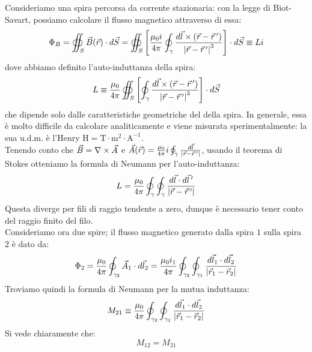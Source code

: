 Consideriamo una spira percorsa da corrente stazionaria: con la legge di Biot-Savart, possiamo calcolare il flusso magnetico attraverso di essa:
\begin{equation}
	\Phi_B = \oiint_S \vec{B}(\vec{r}) \cdot d\vec{S} = \oiint_S \left[ \frac{\mu_0 i}{4\pi} \oint_{\gamma} \frac{d\vec{l} \times (\vec{r} - \vec{r}\,')}{\left\lvert\vec{r}-\vec{r}\,'\right\rvert^3} \right]\cdot d\vec{S} \equiv Li
	\label{eq:17}
\end{equation}
dove abbiamo definito l'auto-induttanza della spira:
\begin{equation}
	L \equiv \frac{\mu_0}{4\pi} \oiint_S \left[ \oint_{\gamma} \frac{d\vec{l} \times (\vec{r} - \vec{r}\,')}{\left\lvert\vec{r}-\vec{r}\,'\right\rvert^3} \right] \cdot d\vec{S}
	\label{eq:18}
\end{equation}
che dipende solo dalle caratteristiche geometriche del della spira. In generale, essa è molto difficile da calcolare analiticamente e viene misurata sperimentalmente: la sua u.d.m. è l'Henry $ \text{H} = \text{T}\cdot\text{m}^2\cdot\text{A}^{-1} $. \\ 
%
Tenendo conto che $ \vec{B} = \nabla\times\vec{A} $ e $ \vec{A}(\vec{r}) = \frac{\mu_0}{4\pi} i \oint_{\gamma} \frac{d\vec{l}}{\left\lvert\vec{r} - \vec{r}\,'\right\rvert} $, usando il teorema di Stokes otteniamo la formula di Neumann per l'auto-induttanza:
\begin{equation}
	L = \frac{\mu_0}{4\pi} \oint_{\gamma} \oint_{\gamma} \frac{d\vec{l}\cdot d\vec{l}\,'}{\left\lvert\vec{r} - \vec{r}\,'\right\rvert}
	\label{eq:19}
\end{equation}
Questa diverge per fili di raggio tendente a zero, dunque è necessario tener conto del raggio finito del filo. \\ 
%
Consideriamo ora due spire; il flusso magnetico generato dalla spira $ 1 $ sulla spira $ 2 $ è dato da:
\begin{equation}
	\Phi_2 = \frac{\mu_0}{4\pi} \oint_{\gamma_2} \vec{A}_1 \cdot d\vec{l}_2 = \frac{\mu_0 i_1}{4\pi} \oint_{\gamma_2} \oint_{\gamma_1} \frac{d\vec{l}_1 \cdot d\vec{l}_2}{\left\lvert\vec{r}_1 - \vec{r}_2\right\rvert}
	\label{eq:20}
\end{equation}
Troviamo quindi la formula di Neumann per la mutua induttanza:
\begin{equation}
	M_{21} \equiv \frac{\mu_0 }{4\pi} \oint_{\gamma_2} \oint_{\gamma_1} \frac{d\vec{l}_1 \cdot d\vec{l}_2}{\left\lvert\vec{r}_1 - \vec{r}_2\right\rvert}
	\label{eq:21}
\end{equation}
Si vede chiaramente che:
\begin{equation}
	M_{12} = M_{21}
	\label{eq:22}
\end{equation}
